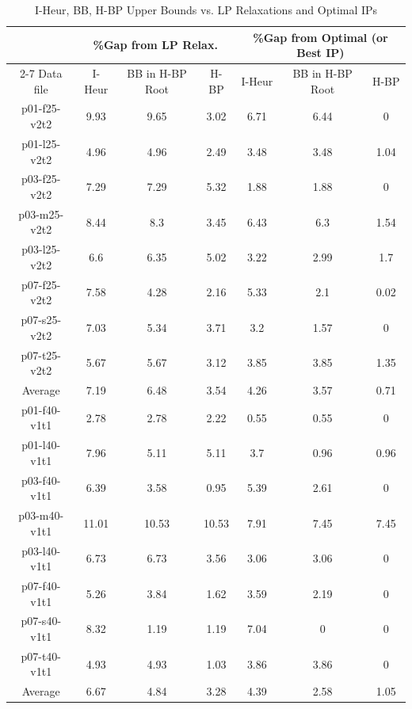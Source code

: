 \begin{table}[!h]
\centering
\caption{I-Heur, BB, H-BP Upper Bounds vs. LP Relaxations and Optimal IPs }\label{primal-heur-table2}
\begin {tabular}[!h]{|c|c|c|c|c|c|c|}
\hline
\mbox{} & \multicolumn{3}{|c|}{\%Gap from LP Relax.} & \multicolumn{3}{|c|}{\%Gap from Optimal (or Best IP)} \\\cline{2-7}
Data file & I-Heur & BB in H-BP Root & H-BP & I-Heur & BB in H-BP Root & H-BP \\\hline
p01-f25-v2t2    & 9.93  & 9.65  & 3.02  & 6.71  & 6.44  &   0   \\
p01-l25-v2t2    & 4.96  & 4.96  & 2.49  & 3.48  & 3.48  &   1.04    \\
p03-f25-v2t2    & 7.29  & 7.29  & 5.32  & 1.88  & 1.88  &   0   \\
p03-m25-v2t2    & 8.44  & 8.3   & 3.45  & 6.43  & 6.3   &   1.54    \\
p03-l25-v2t2    & 6.6   & 6.35  & 5.02  & 3.22  & 2.99  &   1.7 \\
p07-f25-v2t2    & 7.58  & 4.28  & 2.16  & 5.33  & 2.1   &   0.02    \\
p07-s25-v2t2    & 7.03  & 5.34  & 3.71  & 3.2   & 1.57  &   0   \\
p07-t25-v2t2    & 5.67  & 5.67  & 3.12  & 3.85  & 3.85  &   1.35    \\\hline
Average &   7.19    & 6.48  & 3.54  & 4.26  & 3.57  &   0.71    \\\hline
p01-f40-v1t1    & 2.78  & 2.78  & 2.22  & 0.55  & 0.55  &   0   \\
p01-l40-v1t1    & 7.96  & 5.11  & 5.11  & 3.7   & 0.96  &   0.96    \\
p03-f40-v1t1    & 6.39  & 3.58  & 0.95  & 5.39  & 2.61  &   0   \\
p03-m40-v1t1    & 11.01 & 10.53 & 10.53 & 7.91  & 7.45  &   7.45    \\
p03-l40-v1t1    & 6.73  & 6.73  & 3.56  & 3.06  & 3.06  &   0   \\
p07-f40-v1t1    & 5.26  & 3.84  & 1.62  & 3.59  & 2.19  &   0   \\
p07-s40-v1t1    & 8.32  & 1.19  & 1.19  & 7.04  & 0 &   0   \\
p07-t40-v1t1    & 4.93  & 4.93  & 1.03  & 3.86  & 3.86  &   0   \\\hline
Average &   6.67    & 4.84  & 3.28  & 4.39  & 2.58  &   1.05    \\\hline
\end{tabular}
\end{table}

